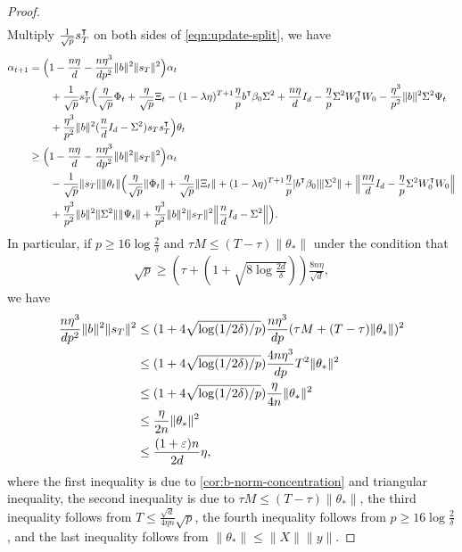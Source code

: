 \begin{proof}
\begin{align}
    \end{align}
    Multiply $\frac{1}{\sqrt{p}} s_T\transpose$ on both sides of \cref{eqn:update-split}, we have
    \begin{align*}
        \alpha_{t+1} & = \Big( 1 - \frac{n\eta}{d} - \frac{n\eta^3}{dp^2} \|b\|^2 \|s_T\|^2 \Big) \alpha_t \\
        & \qquad + \frac{1}{\sqrt{p}} s_T\transpose \Big( \frac{\eta}{\sqrt{p}} \Phi_t + \frac{\eta}{\sqrt p}\Xi_t  - (1-\lambda\eta)^{T+1} \frac{\eta}{p} b\transpose\beta_0 \Sigma^2 + \frac{n\eta}{d}I_d - \frac{\eta}{p}\Sigma^2 W_0\transpose W_0 - \frac{\eta^3}{p^2} \|b\|^2 \Sigma^2 \Psi_t \\
        & \qquad + \frac{\eta^3}{p^2} \|b\|^2 (\frac{n}{d}I_d - \Sigma^2) s_T s_T\transpose \Big)\theta_t \\
        & \geq \Big( 1 - \frac{n\eta}{d} - \frac{n\eta^3}{dp^2} \|b\|^2 \|s_T\|^2 \Big) \alpha_t \\
        & \qquad - \frac{1}{\sqrt{p}} \|s_T\|\|\theta_t\| \Big( \frac{\eta}{\sqrt{p}} \|\Phi_t\| + \frac{\eta}{\sqrt p} \|\Xi_t\| + (1-\lambda\eta)^{T+1} \frac{\eta}{p} |b\transpose\beta_0| \|\Sigma^2\| + \Big\| \frac{n\eta}{d}I_d - \frac{\eta}{p}\Sigma^2 W_0\transpose W_0 \Big\| \\
        & \qquad + \frac{\eta^3}{p^2} \|b\|^2 \|\Sigma^2\| \|\Psi_t\| + \frac{\eta^3}{p^2} \|b\|^2 \|s_T\|^2 \Big\| \frac{n}{d}I_d - \Sigma^2 \Big\| \Big).
    \end{align*}
    In particular, if $p \geq 16\log\frac{2}{\delta}$ and $\tau M \leq (T-\tau) \|\theta_*\|$ under the condition that
    \begin{align*}
        \sqrt{p} \geq \left( \tau + \left(1 + \sqrt{8\log\frac{2d}{\delta}}\right) \right) \frac{8n\eta}{\sqrt{d}},
    \end{align*}
    we have
    \begin{align*}
        \frac{n\eta^3}{dp^2} \|b\|^2 \|s_T\|^2 & \leq (1 + 4\sqrt{\log(1/2\delta)/p}) \frac{n\eta^3}{dp} (\tau M + (T-\tau) \|\theta_*\|)^2 \\
        & \leq (1 + 4\sqrt{\log(1/2\delta)/p}) \frac{4n\eta^3}{dp} T^2 \|\theta_*\|^2 \\
        & \leq (1 + 4\sqrt{\log(1/2\delta)/p}) \frac{\eta}{4n} \|\theta_*\|^2 \\
        & \leq \frac{\eta}{2n} \|\theta_*\|^2 \\
        & \leq \frac{(1+\varepsilon)n}{2d}\eta,
    \end{align*}
    where the first inequality is due to \cref{cor:b-norm-concentration} and triangular inequality, the second inequality is due to $\tau M \leq (T-\tau) \|\theta_*\|$, the third inequality follows from $T \leq \frac{\sqrt{d}}{4\eta n}\sqrt{p}$, the fourth inequality follows from $p \geq 16\log\frac{2}{\delta}$, and the last inequality follows from $\|\theta_*\| \leq \|X\|\|y\|$.
    

\end{proof}
